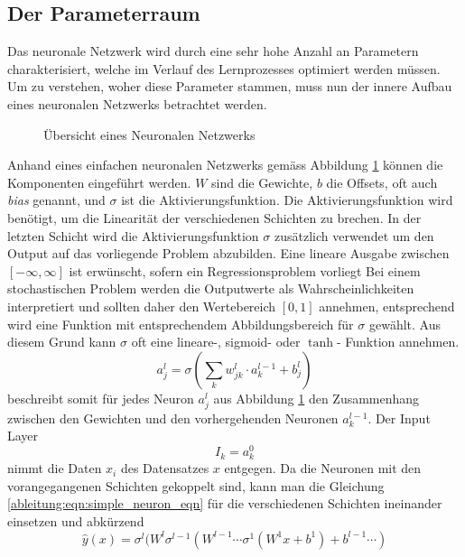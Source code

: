 \subsection{Der Parameterraum}
Das neuronale Netzwerk wird durch eine sehr hohe Anzahl an Parametern charakterisiert, welche im Verlauf des Lernprozesses optimiert werden müssen. Um zu verstehen, woher diese Parameter stammen, muss nun der innere Aufbau eines neuronalen Netzwerks betrachtet werden.
\begin{figure}
	\begin{center}
		
		\caption{Übersicht eines Neuronalen Netzwerks}
		\label{ableitung:fig:neuronal_network}
	\end{center}
\end{figure} 
Anhand eines einfachen neuronalen Netzwerks gemäss Abbildung \ref{ableitung:fig:neuronal_network} können die Komponenten eingeführt werden. $W$ sind die Gewichte, $b$ die Offsets, oft auch \textit{bias} genannt, und $\sigma$ ist die Aktivierungsfunktion. Die Aktivierungsfunktion wird benötigt, um die Linearität der verschiedenen Schichten zu brechen. In der letzten Schicht wird die Aktivierungsfunktion $\sigma$ zusätzlich verwendet um den Output auf das vorliegende Problem abzubilden. Eine lineare Ausgabe zwischen $[-\infty, \infty]$ ist erwünscht, sofern ein Regressionsproblem vorliegt Bei einem stochastischen Problem werden die Outputwerte als Wahrscheinlichkeiten interpretiert und sollten daher den Wertebereich $[0,1]$ annehmen, entsprechend wird eine Funktion mit entsprechendem Abbildungsbereich für $\sigma$ gewählt. Aus diesem Grund kann $\sigma$ oft eine lineare-, sigmoid- oder $\tanh$- Funktion annehmen.
\begin{equation}
a^{l}_{j} = \sigma \left( \sum\limits_{k}w^{l}_{jk} \cdot a^{l-1}_{k}+b^{l}_{j} \right)
\label{ableitung:eqn:simple_neuron_eqn}
\end{equation}
beschreibt somit für jedes Neuron $a^{l}_{j}$ aus Abbildung \ref{ableitung:fig:neuronal_network} den Zusammenhang zwischen den Gewichten und den vorhergehenden Neuronen $a^{l-1}_{k}$. Der Input Layer 
\begin{equation}
I_k = a_{k}^{0}
\end{equation}
nimmt die Daten $x_i$ des Datensatzes $x$ entgegen.
Da die Neuronen mit den vorangegangenen Schichten gekoppelt sind, kann man die Gleichung \eqref{ableitung:eqn:simple_neuron_eqn} für die verschiedenen Schichten ineinander einsetzen und abkürzend
\begin{equation}
\hat{y}(x) = \sigma^{l}(W^{l}\sigma^{l-1}(W^{l-1}\cdots \sigma^{1}(W^{1}x+b^{1}) + b^{l-1} \cdots )
\label{ableitung:eqn:full_net}
\end{equation}
